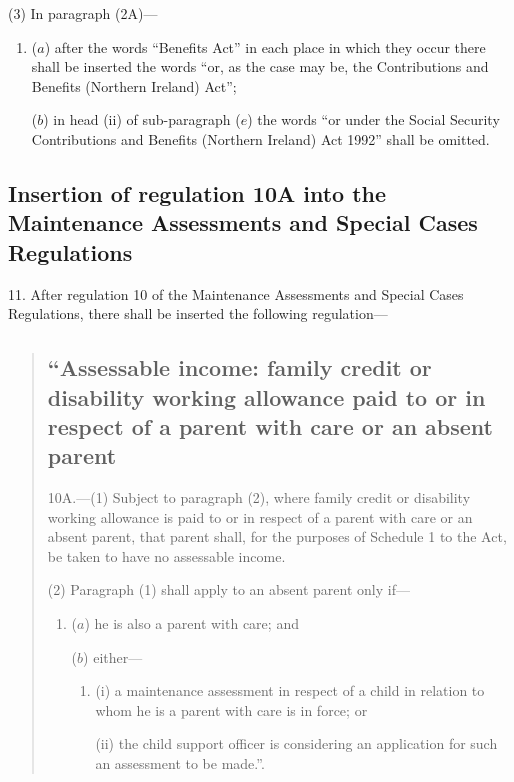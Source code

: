 \documentclass[a4paper]{article}
\begin{document}
(3) In paragraph (2A)—
\begin{enumerate}\item[]
($a$) after the words “Benefits Act” in each place in which they occur there shall be inserted the words “or, as the case may be, the Contributions and Benefits (Northern Ireland) Act”;

($b$) in head (ii) of sub-paragraph ($e$) the words “or under the Social Security Contributions and Benefits (Northern Ireland) Act 1992” shall be omitted.
\end{enumerate}

\subsection[11. Insertion of regulation 10A into the Maintenance Assessments and Special Cases Regulations]{Insertion of regulation 10A into the Maintenance Assessments and Special Cases Regulations}

11.  After regulation 10 of the Maintenance Assessments and Special Cases Regulations, there shall be inserted the following regulation—
\begin{quotation}
\subsection*{\sloppy “Assessable income: family credit or disability working allowance paid to or in respect of a parent with care or an absent parent}

10A.—(1) Subject to paragraph (2), where family credit or disability working allowance is paid to or in respect of a parent with care or an absent parent, that parent shall, for the purposes of Schedule 1 to the Act, be taken to have no assessable income.

(2) Paragraph (1) shall apply to an absent parent only if—
\begin{enumerate}\item[]
($a$) he is also a parent with care; and

($b$) either—
\begin{enumerate}\item[]
(i) a maintenance assessment in respect of a child in relation to whom he is a parent with care is in force; or

(ii) the child support officer is considering an application for such an assessment to be made.”.
\end{enumerate}
\end{enumerate}
\end{quotation}
\end{document}
